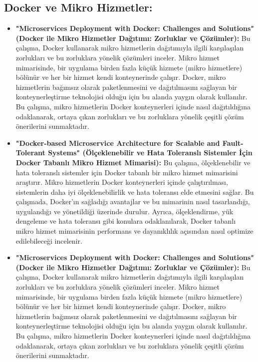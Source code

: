 \subsection{Docker ve Mikro Hizmetler:}
\begin{itemize}
\item  \textbf{"Microservices Deployment with Docker: Challenges and Solutions" (Docker ile Mikro Hizmetler Dağıtımı: Zorluklar ve Çözümler):}
Bu çalışma, Docker kullanarak mikro hizmetlerin dağıtımıyla ilgili karşılaşılan zorlukları ve bu zorluklara yönelik çözümleri inceler. Mikro hizmet mimarisinde, bir uygulama birden fazla küçük hizmete (mikro hizmetlere) bölünür ve her bir hizmet kendi konteynerinde çalışır. Docker, mikro hizmetlerin bağımsız olarak paketlenmesini ve dağıtılmasını sağlayan bir konteynerleştirme teknolojisi olduğu için bu alanda yaygın olarak kullanılır. Bu çalışma, mikro hizmetlerin Docker konteynerleri içinde nasıl dağıtıldığına odaklanarak, ortaya çıkan zorlukları ve bu zorluklara yönelik çeşitli çözüm önerilerini sunmaktadır.\\
\item \textbf{"Docker-based Microservice Architecture for Scalable and Fault-Tolerant Systems" (Ölçeklenebilir ve Hata Toleranslı Sistemler İçin Docker Tabanlı Mikro Hizmet Mimarisi):}
Bu çalışma, ölçeklenebilir ve hata toleranslı sistemler için Docker tabanlı bir mikro hizmet mimarisini araştırır. Mikro hizmetlerin Docker konteynerleri içinde çalıştırılması, sistemlerin daha iyi ölçeklenebilirlik ve hata toleransı elde etmesini sağlar. Bu çalışmada, Docker'ın sağladığı avantajlar ve bu mimarinin nasıl tasarlandığı, uygulandığı ve yönetildiği üzerinde durulur. Ayrıca, ölçeklendirme, yük dengeleme ve hata toleransı gibi konulara odaklanılarak, Docker tabanlı mikro hizmet mimarisinin performans ve dayanıklılık açısından nasıl optimize edilebileceği incelenir.\\
\item \textbf{"Microservices Deployment with Docker: Challenges and Solutions" (Docker ile Mikro Hizmetler Dağıtımı: Zorluklar ve Çözümler):}
Bu çalışma, Docker kullanarak mikro hizmetlerin dağıtımıyla ilgili karşılaşılan zorlukları ve bu zorluklara yönelik çözümleri inceler. Mikro hizmet mimarisinde, bir uygulama birden fazla küçük hizmete (mikro hizmetlere) bölünür ve her bir hizmet kendi konteynerinde çalışır. Docker, mikro hizmetlerin bağımsız olarak paketlenmesini ve dağıtılmasını sağlayan bir konteynerleştirme teknolojisi olduğu için bu alanda yaygın olarak kullanılır. Bu çalışma, mikro hizmetlerin Docker konteynerleri içinde nasıl dağıtıldığına odaklanarak, ortaya çıkan zorlukları ve bu zorluklara yönelik çeşitli çözüm önerilerini sunmaktadır.

\end{itemize}

